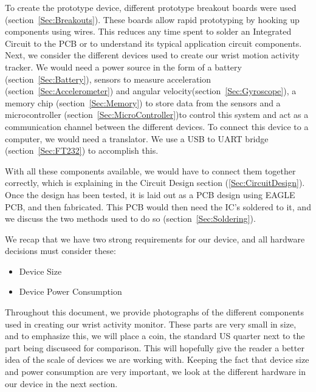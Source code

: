 To create the prototype device, different prototype breakout boards were used (section~\ref{Sec:Breakouts}). These boards allow rapid prototyping by hooking up components using wires. This reduces any time spent to solder an Integrated Circuit to the PCB or to understand its typical application circuit components. Next, we consider the different devices used to create our wrist motion activity tracker. We would need a power source in the form of a battery (section~\ref{Sec:Battery}), sensors to measure acceleration (section~\ref{Sec:Accelerometer}) and angular velocity(section~\ref{Sec:Gyroscope}), a memory chip (section~\ref{Sec:Memory}) to store data from the sensors and a microcontroller (section~\ref{Sec:MicroController})to control this system and act as a communication channel between the different devices. To connect this device to a computer, we would need a translator. We use a USB to UART bridge (section~\ref{Sec:FT232}) to accomplish this.

With all these components available, we would have to connect them together correctly, which is explaining in the Circuit Design section (\ref{Sec:CircuitDesign}). Once the design has been tested, it is laid out as a PCB design using EAGLE PCB, and then fabricated. This PCB would then need the IC's soldered to it, and we discuss the two methods used to do so (section~\ref{Sec:Soldering}).

We recap that we have two strong requirements for our device, and all hardware decisions must consider these:
\begin{itemize}
  \item Device Size
  \item Device Power Consumption
\end{itemize}

Throughout this document,
we provide photographs of the different components used in creating our wrist activity monitor.
These parts are very small in size,
and to emphasize this,
we will place a coin,
the standard US quarter next to the part being discuseed for comparison.
This will hopefully give the reader a better idea of the scale of devices we are working with.
Keeping the fact that device size and power consumption are very important,
we look at the different hardware in our device in the next section.

